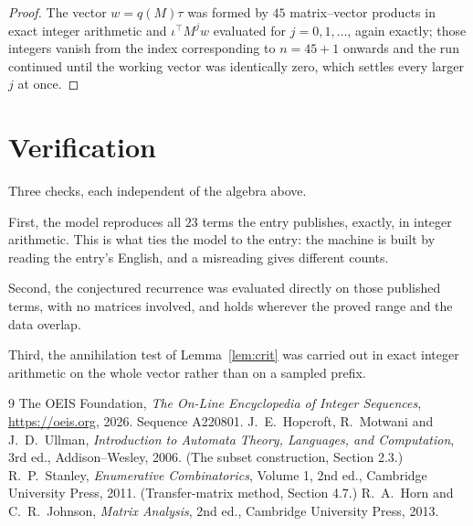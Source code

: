 \documentclass[11pt,a4paper]{article}
\theoremstyle{plain}
\theoremstyle{definition}
\begin{document}
\begin{proof}
The vector $w=q(M)\tau$ was formed by $45$ matrix--vector products in exact integer
arithmetic and $\iota^{\!\top}M^{j}w$ evaluated for $j=0,1,\dots$, again exactly; those
integers vanish from the index corresponding to $n=45+1$ onwards and the run continued
until the working vector was identically zero, which settles every larger $j$ at once.
\end{proof}

\section{Verification}

Three checks, each independent of the algebra above.

First, the model reproduces all $23$ terms the entry publishes, exactly, in integer
arithmetic. This is what ties the model to the entry: the machine is built by reading the
entry's English, and a misreading gives different counts.

Second, the conjectured recurrence was evaluated directly on those published terms, with no
matrices involved, and holds wherever the proved range and the data overlap.

Third, the annihilation test of Lemma~\ref{lem:crit} was carried out in exact integer
arithmetic on the whole vector rather than on a sampled prefix.

\begin{thebibliography}{9}
 The OEIS Foundation, \emph{The On-Line Encyclopedia of Integer
Sequences}, \url{https://oeis.org}, 2026. Sequence A220801.
 J.~E.~Hopcroft, R.~Motwani and J.~D.~Ullman, \emph{Introduction to Automata
Theory, Languages, and Computation}, 3rd ed., Addison--Wesley, 2006. (The subset
construction, Section 2.3.)
 R.~P.~Stanley, \emph{Enumerative Combinatorics}, Volume 1, 2nd ed.,
Cambridge University Press, 2011. (Transfer-matrix method, Section 4.7.)
 R.~A.~Horn and C.~R.~Johnson, \emph{Matrix Analysis}, 2nd ed., Cambridge
University Press, 2013.
\end{thebibliography}
\end{document}
